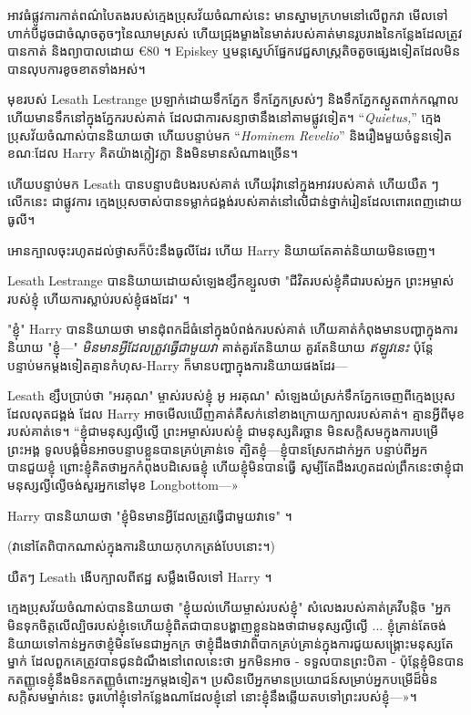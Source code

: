 {{{{អាវធំផ្លូវការកាត់ពណ៌បៃតងរបស់ក្មេងប្រុសវ័យចំណាស់នេះ មានស្នាមក្រហមនៅលើពួកវា មើលទៅហាក់បីដូចជាចំណុចតូចៗនៃឈាមស្រស់ ហើយជ្រុងម្ខាងនៃមាត់របស់គាត់មានរូបរាងនៃកន្លែងដែលត្រូវបានកាត់ និងព្យាបាលដោយ €80 ។ {Episkey} ឬមន្តស្នេហ៍ផ្នែកវេជ្ជសាស្រ្តតិចតួចផ្សេងទៀតដែលមិនបានលុបការខូចខាតទាំងអស់។

មុខរបស់ Lesath Lestrange ប្រឡាក់ដោយទឹកភ្នែក ទឹកភ្នែកស្រស់ៗ និងទឹកភ្នែកស្ងួតពាក់កណ្តាល ហើយមានទឹកនៅក្នុងភ្នែករបស់គាត់ ដែលជាការសន្យាថានឹងនៅតាមផ្លូវទៀត។ “\emph{Quietus,}” ក្មេងប្រុសវ័យចំណាស់បាននិយាយថា ហើយបន្ទាប់មក “\emph{Hominem Revelio}” និងរឿងមួយចំនួនទៀត ខណៈដែល Harry គិតយ៉ាងក្លៀវក្លា និងមិនមានសំណាងច្រើន។

ហើយបន្ទាប់មក Lesath បានបន្ទាបដំបងរបស់គាត់ ហើយរុំវានៅក្នុងអាវរបស់គាត់ ហើយយឺត ៗ លើកនេះ ជាផ្លូវការ ក្មេងប្រុសចាស់បានទម្លាក់ជង្គង់របស់គាត់នៅលើជាន់ថ្នាក់រៀនដែលពោរពេញដោយធូលី។

អោន​ក្បាល​ចុះ​រហូត​ដល់​ថ្ងាស​ក៏​ប៉ះ​នឹង​ធូលី​ដែរ ហើយ Harry និយាយ​តែ​គាត់​និយាយ​មិន​ចេញ។

Lesath Lestrange បាននិយាយដោយសំឡេងខ្សឹកខ្សួលថា "ជីវិតរបស់ខ្ញុំគឺជារបស់អ្នក ព្រះអម្ចាស់របស់ខ្ញុំ ហើយការស្លាប់របស់ខ្ញុំផងដែរ" ។

"ខ្ញុំ" Harry បាននិយាយថា មានដុំពកដ៏ធំនៅក្នុងបំពង់ករបស់គាត់ ហើយគាត់កំពុងមានបញ្ហាក្នុងការនិយាយ "ខ្ញុំ—" \emph{មិនមានអ្វីដែលត្រូវធ្វើជាមួយវា} គាត់គួរតែនិយាយ គួរតែនិយាយ \emph{ឥឡូវនេះ} ប៉ុន្តែបន្ទាប់មកម្តងទៀតគ្មានកំហុស-Harry ក៏មានបញ្ហាក្នុងការនិយាយផងដែរ—

Lesath ខ្សឹបប្រាប់ថា "អរគុណ" ម្ចាស់របស់ខ្ញុំ អូ អរគុណ" សំឡេងយំស្រក់ទឹកភ្នែកចេញពីក្មេងប្រុសដែលលុតជង្គង់ ដែល Harry អាចមើលឃើញគាត់គឺសក់នៅខាងក្រោយក្បាលរបស់គាត់។ គ្មានអ្វីពីមុខរបស់គាត់ទេ។ “ខ្ញុំជាមនុស្សល្ងីល្ងើ ព្រះអម្ចាស់របស់ខ្ញុំ ជាមនុស្សតិរច្ឆាន មិនសក្តិសមក្នុងការបម្រើព្រះអង្គ ទូលបង្គំមិនអាចបន្ទាបខ្លួនបានគ្រប់គ្រាន់ទេ ត្បិតខ្ញុំ—ខ្ញុំបានស្រែកដាក់អ្នក បន្ទាប់ពីអ្នកបានជួយខ្ញុំ ព្រោះខ្ញុំគិតថាអ្នកកំពុងបដិសេធខ្ញុំ ហើយខ្ញុំមិនបានធ្វើ សូម្បី​តែ​ដឹង​រហូត​ដល់​ព្រឹក​នេះ​ថា​ខ្ញុំ​ជា​មនុស្ស​ល្ងីល្ងើ​ចង់​សួរ​អ្នក​នៅ​មុខ Longbottom—»

Harry បាននិយាយថា "ខ្ញុំមិនមានអ្វីដែលត្រូវធ្វើជាមួយវាទេ" ។

(វា​នៅ​តែ​ពិបាក​ណាស់​ក្នុង​ការ​និយាយ​កុហក​ត្រង់​បែប​នោះ។)

យឺតៗ Lesath ងើបក្បាលពីឥដ្ឋ សម្លឹងមើលទៅ Harry ។

ក្មេងប្រុសវ័យចំណាស់បាននិយាយថា "ខ្ញុំយល់ហើយម្ចាស់របស់ខ្ញុំ" សំលេងរបស់គាត់គ្រវីបន្តិច "អ្នកមិនទុកចិត្តលើល្បិចរបស់ខ្ញុំទេហើយខ្ញុំពិតជាបានបង្ហាញខ្លួនឯងថាជាមនុស្សល្ងីល្ងើ ... ខ្ញុំគ្រាន់តែចង់និយាយទៅកាន់អ្នកថាខ្ញុំមិនមែនជាអ្នកក្រ ថាខ្ញុំដឹងថាវាពិបាកគ្រប់គ្រាន់ក្នុងការជួយសង្គ្រោះមនុស្សតែម្នាក់ ដែលពួកគេត្រូវបានជូនដំណឹងនៅពេលនេះថា អ្នកមិនអាច - ទទួលបានព្រះបិតា - ប៉ុន្តែខ្ញុំមិនបានកតញ្ញូទេខ្ញុំនឹងមិនកតញ្ញូចំពោះអ្នកម្តងទៀត។ ប្រសិន​បើ​អ្នក​មាន​ប្រយោជន៍​សម្រាប់​អ្នក​បម្រើ​ដ៏​មិន​សក្តិសម​ម្នាក់​នេះ ចូរ​ហៅ​ខ្ញុំ​ទៅ​កន្លែង​ណា​ដែល​ខ្ញុំ​នៅ នោះ​ខ្ញុំ​នឹង​ឆ្លើយ​តប​ទៅ​ព្រះ​របស់​ខ្ញុំ—»។

}}}}
